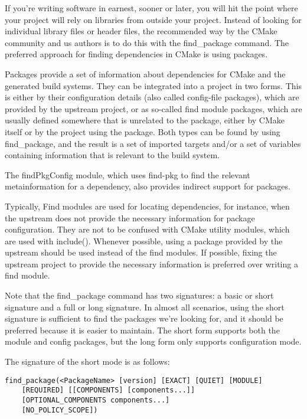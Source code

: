 
If you're writing software in earnest, sooner or later, you will hit the point where your project will rely on libraries from outside your project. Instead of looking for individual library files or header files, the recommended way by the CMake community and us authors is to do this with the find\_package command. The preferred approach for finding dependencies in CMake is using packages.

Packages provide a set of information about dependencies for CMake and the generated build systems. They can be integrated into a project in two forms. This is either by their configuration details (also called config-file packages), which are provided by the upstream project, or as so-called find module packages, which are usually defined somewhere that is unrelated to the package, either by CMake itself or by the project using the package. Both types can be found by using find\_package, and the result is a set of imported targets and/or a set of variables containing information that is relevant to the build system.

The findPkgConfig module, which uses find-pkg to find the relevant metainformation for a dependency, also provides indirect support for packages.

Typically, Find modules are used for locating dependencies, for instance, when the upstream does not provide the necessary information for package configuration. They are not to be confused with CMake utility modules, which are used with include(). Whenever possible, using a package provided by the upstream should be used instead of the find modules. If possible, fixing the upstream project to provide the necessary information is preferred over writing a find module.

Note that the find\_package command has two signatures: a basic or short signature and a full or long signature. In almost all scenarios, using the short signature is sufficient to find the packages we're looking for, and it should be preferred because it is easier to maintain. The short form supports both the module and config packages, but the long form only supports configuration mode.

The signature of the short mode is as follows:

\begin{lstlisting}[style=styleCMake]
find_package(<PackageName> [version] [EXACT] [QUIET] [MODULE]
	[REQUIRED] [[COMPONENTS] [components...]]
	[OPTIONAL_COMPONENTS components...]
	[NO_POLICY_SCOPE])
\end{lstlisting}

